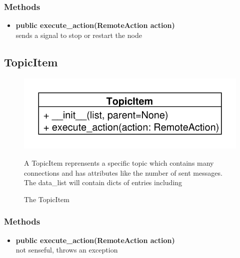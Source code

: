\subsubsection{Methods}
\begin{itemize}
  \item \textbf{public execute\_action(RemoteAction action)}\\
  sends a signal to stop or restart the node
\end{itemize}

\subsection{TopicItem}
\begin{figure}[htbp]
	\begin{minipage}[t]{7cm}
		\vspace{0pt}
		\centering
		\includegraphics[scale=0.6]{./diagram_pictures/TopicItem.pdf}
		\caption{The TopicItem}
	\end{minipage}
	\hfill
	\begin{minipage}[t]{8cm}
		\vspace{10pt}		
		A TopicItem reprensents a specific topic which contains many connections and has attributes like the number of sent messages.
		The data\_list will contain dicts of entries including 
	\end{minipage}
\end{figure} 
\subsubsection{Methods}
\begin{itemize}
  \item \textbf{public execute\_action(RemoteAction action)}\\ 
  not senseful, throws an exception
\end{itemize}

